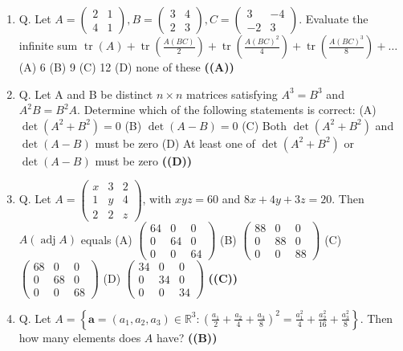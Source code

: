 \documentclass{article}
\begin{document}
\begin{enumerate}
(D) $a = b = \frac{1}{\sqrt{3}}$ \hfill \textbf{((B))}
\item Q. Let
$A=\begin{pmatrix} 2 & 1 \\ 4 & 1 \end{pmatrix}, B=\begin{pmatrix} 3 & 4 \\ 2 & 3 \end{pmatrix}, C=\begin{pmatrix} 3 & -4 \\ -2 & 3 \end{pmatrix}$.
Evaluate the infinite sum
$\operatorname{tr}(A) + \operatorname{tr}(\frac{A(BC)}{2}) + \operatorname{tr}(\frac{A(BC)^2}{4}) + \operatorname{tr}(\frac{A(BC)^3}{8}) + \dots$
(A) 6
(B) 9
(C) 12
(D) none of these \hfill \textbf{((A))}
\item Q. Let A and B be distinct $n \times n$ matrices satisfying
$A^3 = B^3$ and $A^2B = B^2A$.
Determine which of the following statements is correct:
(A) $\det(A^2 + B^2) = 0$
(B) $\det(A - B) = 0$
(C) Both $\det(A^2 + B^2)$ and $\det(A - B)$ must be zero
(D) At least one of $\det(A^2 + B^2)$ or $\det(A - B)$ must be zero \hfill \textbf{((D))}
\item Q. Let
$A = \begin{pmatrix} x & 3 & 2 \\ 1 & y & 4 \\ 2 & 2 & z \end{pmatrix}$,
with $xyz = 60$ and $8x + 4y + 3z = 20$. Then $A (\operatorname{adj} A)$ equals
(A) $\begin{pmatrix} 64 & 0 & 0 \\ 0 & 64 & 0 \\ 0 & 0 & 64 \end{pmatrix}$
(B) $\begin{pmatrix} 88 & 0 & 0 \\ 0 & 88 & 0 \\ 0 & 0 & 88 \end{pmatrix}$
(C) $\begin{pmatrix} 68 & 0 & 0 \\ 0 & 68 & 0 \\ 0 & 0 & 68 \end{pmatrix}$
(D) $\begin{pmatrix} 34 & 0 & 0 \\ 0 & 34 & 0 \\ 0 & 0 & 34 \end{pmatrix}$ \hfill \textbf{((C))}
\item Q. Let
$A = \left\{\mathbf{a} = (a_1, a_2, a_3) \in \mathbb{R}^3 : \left(\frac{a_1}{2} + \frac{a_2}{4} + \frac{a_3}{8}\right)^2 = \frac{a_1^2}{4} + \frac{a_2^2}{16} + \frac{a_3^2}{8}\right\}$.
Then how many elements does $A$ have? \hfill \textbf{((B))}
\end{enumerate}
\end{document}
